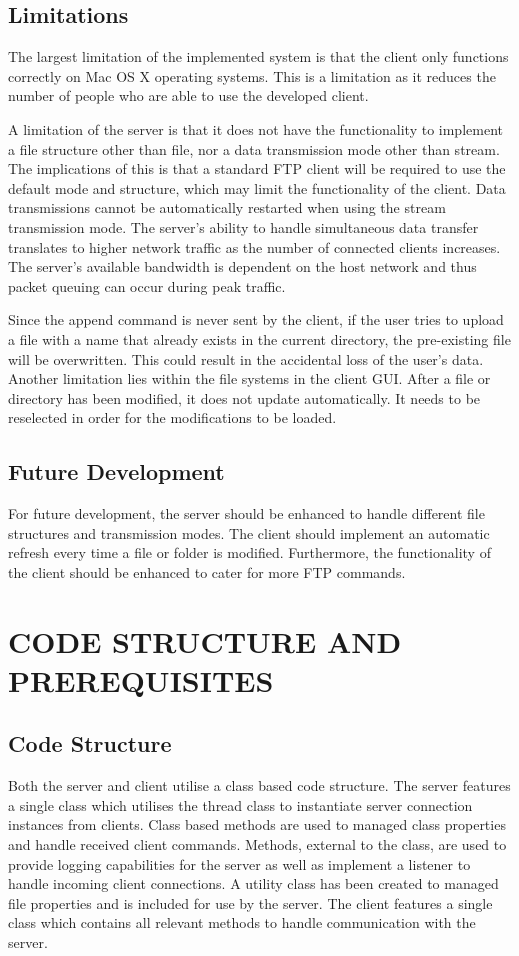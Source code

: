 \documentclass[10pt,twocolumn]{witseiepaper}
\begin{document}
\subsection{Limitations}
The largest limitation of the implemented system is that the client only functions correctly on Mac OS X operating systems. This is a limitation as it reduces the number of people who are able to use the developed client.

A limitation of the server is that it does not have the functionality to implement a file structure other than file, nor a data transmission mode other than stream. The implications of this is that a standard FTP client will be required to use the default mode and structure, which may limit the functionality of the client. Data transmissions cannot be automatically restarted when using the stream transmission mode. The server's ability to handle simultaneous data transfer translates to higher network traffic as the number of connected clients increases. The server's available bandwidth is dependent on the host network and thus packet queuing can occur during peak traffic.

Since the append command is never sent by the client, if the user tries to upload a file with a name that already exists in the current directory, the pre-existing file will be overwritten. This could result in the accidental loss of the user's data. Another limitation lies within the file systems in the client GUI. After a file or directory has been modified, it does not update automatically. It needs to be reselected in order for the modifications to be loaded.

\subsection{Future Development}
For future development, the server should be enhanced to handle different file structures and transmission modes. The client should implement an automatic refresh every time a file or folder is modified. Furthermore, the functionality of the client should be enhanced to cater for more FTP commands.

\section{CODE STRUCTURE AND PREREQUISITES}

\subsection{Code Structure}
Both the server and client utilise a class based code structure. The server features a single class which utilises the thread class to instantiate server connection instances from clients. Class based methods are used to managed class properties and handle received client commands. Methods, external to the class, are used to provide logging capabilities for the server as well as implement a listener to handle incoming client connections. A utility class has been created to managed file properties and is included for use by the server. The client features a single class which contains all relevant methods to handle communication with the server.
\end{document}
